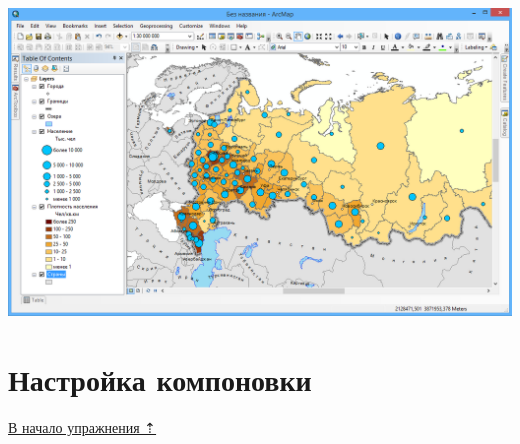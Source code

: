 \documentclass[]{book}
\theoremstyle{definition}
\theoremstyle{definition}
\theoremstyle{definition}
\theoremstyle{remark}
\begin{document}
\begin{enumerate}
  \includegraphics{images/Ex04/image28.png}
\end{enumerate}

\hypertarget{map-design-economic-layout}{%
\section{Настройка компоновки}\label{map-design-economic-layout}}

\protect\hyperlink{map-design-economic}{В начало упражнения ⇡}
\end{document}
